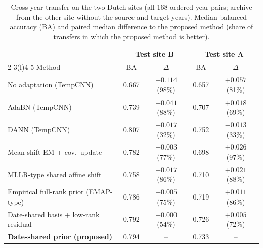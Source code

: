 \begin{table}[!t]
\caption{Cross-year transfer on the two Dutch sites (all 168 ordered year pairs; archive from the other site without the source and target years). Median balanced accuracy (BA) and paired median difference to the proposed method (share of transfers in which the proposed method is better).}
\label{tab:nl}
\centering\footnotesize
\begin{tabular}{@{}lcccc@{}}
\toprule
 & \multicolumn{2}{c}{Test site B} & \multicolumn{2}{c}{Test site A}\\
\cmidrule(lr){2-3}\cmidrule(l){4-5}
Method & BA & $\Delta$ & BA & $\Delta$\\
\midrule
No adaptation (TempCNN) & 0.667 & $+0.114$ (98\%) & 0.657 & $+0.057$ (81\%)\\
AdaBN (TempCNN) & 0.739 & $+0.041$ (88\%) & 0.707 & $+0.018$ (69\%)\\
DANN (TempCNN) & 0.807 & $-0.017$ (32\%) & 0.752 & $-0.013$ (33\%)\\
Mean-shift EM + cov.\ update & 0.782 & $+0.003$ (77\%) & 0.698 & $+0.026$ (97\%)\\
MLLR-type shared affine shift & 0.758 & $+0.017$ (86\%) & 0.710 & $+0.021$ (88\%)\\
Empirical full-rank prior (EMAP-type) & 0.786 & $+0.005$ (75\%) & 0.719 & $+0.011$ (86\%)\\
Date-shared basis + low-rank residual & 0.792 & $+0.000$ (54\%) & 0.726 & $+0.005$ (72\%)\\
\textbf{Date-shared prior (proposed)} & 0.794 & -- & 0.733 & --\\
\bottomrule
\end{tabular}
\end{table}